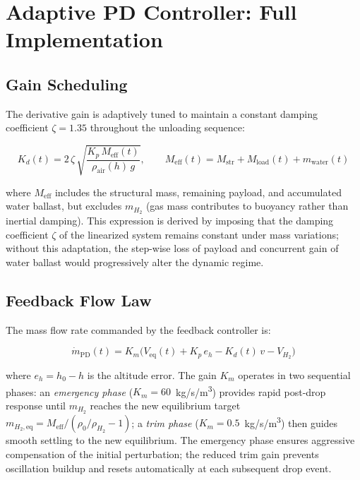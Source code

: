 \section{Adaptive PD Controller: Full Implementation}
\label{app:control}

\subsection*{Gain Scheduling}

The derivative gain is adaptively tuned to maintain a constant damping coefficient $\zeta = 1.35$ throughout the unloading sequence:

\begin{equation}
K_d(t) = 2\,\zeta\,\sqrt{\frac{K_p\,M_\text{eff}(t)}{\rho_\text{air}(h)\,g}}, \qquad
M_\text{eff}(t) = M_\text{str} + M_\text{load}(t) + m_\text{water}(t)
\label{eq:kd_app}
\end{equation}

where $M_\text{eff}$ includes the structural mass, remaining payload, and accumulated water ballast, but excludes $m_{H_2}$ (gas mass contributes to buoyancy rather than inertial damping). This expression is derived by imposing that the damping coefficient $\zeta$ of the linearized system remains constant under mass variations; without this adaptation, the step-wise loss of payload and concurrent gain of water ballast would progressively alter the dynamic regime.

\subsection*{Feedback Flow Law}

The mass flow rate commanded by the feedback controller is:

\begin{equation}
\dot{m}_\text{PD}(t) = K_m\bigl(V_\text{eq}(t) + K_p\,e_h - K_d(t)\,v - V_{H_2}\bigr)
\label{eq:mpd_app}
\end{equation}

where $e_h = h_0 - h$ is the altitude error. The gain $K_m$ operates in two sequential phases: an \emph{emergency phase} ($K_m = 60$~kg/s/m\textsuperscript{3}) provides rapid post-drop response until $m_{H_2}$ reaches the new equilibrium target $m_{H_2,\text{eq}} = M_\text{eff}/(\rho_0/\rho_{H_2}-1)$; a \emph{trim phase} ($K_m = 0.5$~kg/s/m\textsuperscript{3}) then guides smooth settling to the new equilibrium. The emergency phase ensures aggressive compensation of the initial perturbation; the reduced trim gain prevents oscillation buildup and resets automatically at each subsequent drop event.


